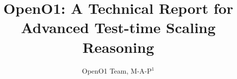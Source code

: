 \documentclass[11pt, a4paper, logo, copyright, nonumbering]{map}
\title{\centering OpenO1: A Technical Report for Advanced Test-time Scaling Reasoning}
\author{
OpenO1 Team, M-A-P$^1$
}
\begin{document}
\begin{CJK*}{UTF8}{gbsn}

\maketitle


\newpage

\tableofcontents


\newpage





\newpage



\newpage
% 


\end{CJK*}
\end{document}
